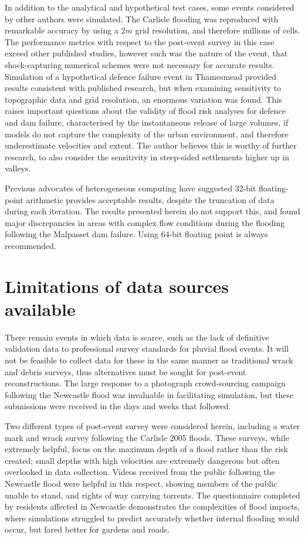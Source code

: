 In addition to the analytical and hypothetical test cases, some events considered by other authors were simulated. The Carlisle flooding was reproduced with remarkable accuracy by using a $2m$ grid resolution, and therefore millions of cells. The performance metrics with respect to the post-event survey in this case exceed other published studies, however such was the nature of the event, that shock-capturing numerical schemes were not necessary for accurate results. Simulation of a hypothetical defence failure event in Thamesmead provided results consistent with published research, but when examining sensitivity to topographic data and grid resolution, an enormous variation was found. This raises important questions about the validity of flood risk analyses for defence and dam failure, characterised by the instantaneous release of large volumes, if models do not capture the complexity of the urban environment, and therefore underestimate velocities and extent. The author believes this is worthy of further research, to also consider the sensitivity in steep-sided settlements higher up in valleys.

Previous advocates of heterogeneous computing have suggested 32-bit floating-point arithmetic provides acceptable results, despite the truncation of data during each iteration. The results presented herein do not support this, and found major discrepancies in areas with complex flow conditions during the flooding following the Malpasset dam failure. Using 64-bit floating point is always recommended.

\section{Limitations of data sources available}

There remain events in which data is scarce, such as the lack of definitive validation data to professional survey standards for pluvial flood events. It will not be feasible to collect data for these in the same manner as traditional wrack and debris surveys, thus alternatives must be sought for post-event reconstructions. The large response to a photograph crowd-sourcing campaign following the Newcastle flood was invaluable in facilitating simulation, but these submissions were received in the days and weeks that followed.

Two different types of post-event survey were considered herein, including a water mark and wrack survey following the Carlisle 2005 floods. These surveys, while extremely helpful, focus on the maximum depth of a flood rather than the risk created; small depths with high velocities are extremely dangerous but often overlooked in data collection. Videos received from the public following the Newcastle flood were helpful in this respect, showing members of the public unable to stand, and rights of way carrying torrents. The questionnaire completed by residents affected in Newcastle demonstrates the complexities of flood impacts, where simulations struggled to predict accurately whether internal flooding would occur, but fared better for gardens and roads.

